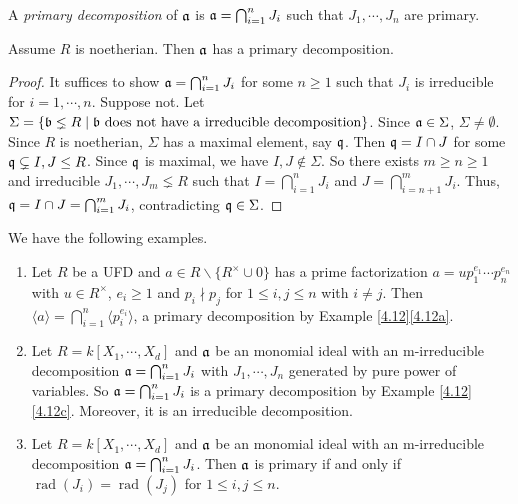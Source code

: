 \begin{definition}\label{4.16}
    A \emph{primary decomposition} of $\mathfrak{a}$ is $\mathfrak{a} = \bigcap_{i=1}^{n} J_i$ such that $J_1,\cdots,J_n$ are primary. 
\end{definition}

\begin{theorem}[Noether]\label{4.17}
    Assume $R$ is noetherian. Then $\mathfrak{a}$ has a primary decomposition.
\end{theorem}

\begin{proof}
    It suffices to show $\mathfrak{a} = \bigcap_{i=1}^{n} J_i$ for some $n \geq 1$ such that $J_i$ is irreducible for $i = 1,\cdots,n$. Suppose not. Let $\Sigma = \{\mathfrak{b} \lneq R \mid \mathfrak{b} \text{ does not have a irreducible decomposition}\}$. Since $\mathfrak{a} \in \Sigma$, $\Sigma \neq \emptyset$. Since $R$ is noetherian, $\Sigma$ has a maximal element, say $\mathfrak{q}$. Then $\mathfrak{q} = I \cap J$ for some $\mathfrak{q} \subsetneq I,J \leq R$. Since $\mathfrak{q}$ is maximal, we have $I,J \not \in \Sigma$. So there exists $m \geq n \geq 1$ and irreducible $J_1,\cdots,J_m \lneq R$ such that $I = \bigcap_{i=1}^{n}J_i$ and $J = \bigcap_{i=n+1}^{m} J_i$. Thus, $\mathfrak{q} = I \cap J = \bigcap_{i=1}^{m} J_i$, contradicting $\mathfrak{q} \in \Sigma$.
\end{proof}

\begin{example}\label{4.18}
    We have the following examples.
    \begin{enumerate}
        \item\label{4.18a} Let $R$ be a UFD and $a \in R \smallsetminus \{R^{\times} \cup 0\}$ has a prime factorization $a = up_1^{e_1} \cdots p_n^{e_n}$ with $u \in R^{\times}$, $e_i \geq 1$ and $p_i \nmid p_j$ for $1 \leq i,j \leq n$ with $i \neq j$. Then $\langle a \rangle = \bigcap_{i=1}^{n} \langle p_i^{e_i} \rangle$, a primary decomposition by Example \ref{4.12}\ref{4.12a}. 
        \item\label{4.18b} Let $R = k[X_1,\cdots,X_d]$ and $\mathfrak{a}$ be an monomial ideal with an m-irreducible decomposition $\mathfrak{a} = \bigcap_{i=1}^{n}J_i$ with $J_1,\cdots,J_n$ generated by pure power of variables. So $\mathfrak{a} = \bigcap_{i=1}^{n} J_i$ is a primary decomposition by Example \ref{4.12}\ref{4.12c}. Moreover, it is an irreducible decomposition.
        \item\label{4.18c} Let $R = k[X_1,\cdots,X_d]$ and $\mathfrak{a}$ be an monomial ideal with an m-irreducible decomposition $\mathfrak{a} = \bigcap_{i=1}^{n}J_i$. Then $\mathfrak{a}$ is primary if and only if $\operatorname{rad}(J_i) = \operatorname{rad}(J_j)$ for $1 \leq i,j \leq n$.
    \end{enumerate}
\end{example}

